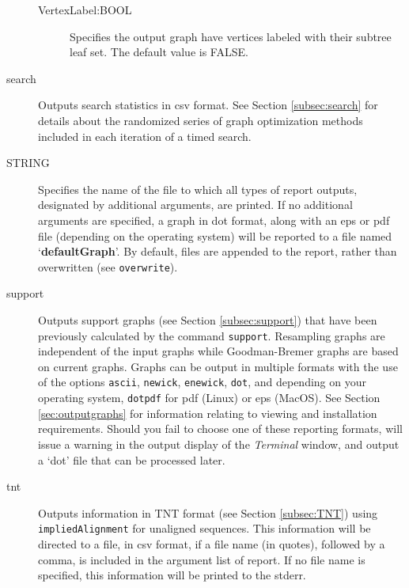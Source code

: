 \begin{description}
\begin{description}
			\item [VertexLabel:BOOL] Specifies the output graph have vertices 
			labeled with their subtree leaf set. The default value is FALSE.	
				
		\end{description}	
				
		\item[search] Outputs search statistics in csv format. See Section 
		\ref{subsec:search} for details about the randomized series of graph 
		optimization methods included in each iteration of a timed search.
			
		\item [STRING] Specifies the name of the file to which all types of report 
		outputs, designated by additional arguments, are printed. If no additional 
		arguments are specified, a graph in dot format, along with an eps or pdf 
		file (depending on the operating system) will be reported to a file named 
		`\textbf{defaultGraph}'. By default, files are appended to the report, rather 
		than overwritten (see \texttt{overwrite}).
				
		\item[support] Outputs support graphs (see Section \ref{subsec:support})
		that have been previously calculated by the command \texttt{support}. 
		Resampling graphs \citep{Farrisetal1996} are independent of the input graphs 
		while Goodman-Bremer graphs \citep{Goodmanetal1982, bremer1994} are 
		based on current graphs. Graphs can be output in multiple formats with the
		use of the options \texttt{ascii}, \texttt{newick}, \texttt{enewick}, \texttt{dot}, 
		and depending on your operating system, \texttt{dotpdf} for pdf (Linux) or 
		eps (MacOS). See Section \ref{sec:outputgraphs} for information relating to 
		viewing and installation requirements. Should you fail to choose one of 
		these reporting formats, \phyg will issue a warning in the output display 
		of the \textit{Terminal} window, and output a `dot' file that can be processed 
		later.
		
		\item[tnt] Outputs information in TNT \citep{Goloboffetal2008} format (see 
		Section \ref{subsec:TNT}) using \texttt{impliedAlignment} for unaligned 
		sequences. This information will be directed to a file, in csv format, if a file 
		name (in quotes), followed by a comma, is included in the argument list of 
		report. If no file name is specified, this information will be printed to the stderr.
				 
	\end{description}			
		
